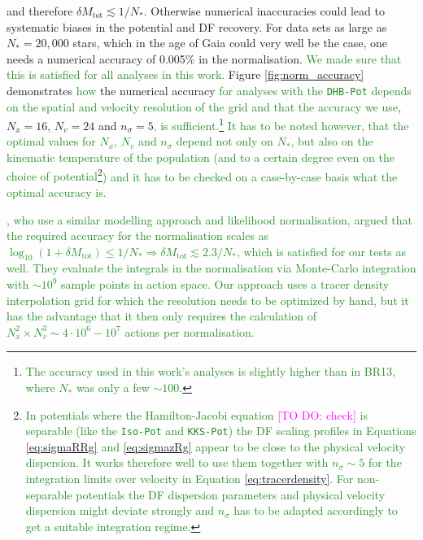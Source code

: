 \documentclass[iop,revtex4]{emulateapj}
\newcommand{\NEW}[1]{\textcolor{ForestGreen}{#1}}
\newcommand{\Wilma}[1]{\textcolor{Magenta}{#1}}
\newcommand{\OLD}[1]{}
\begin{document}
and therefore $\delta M_\text{tot} \lesssim 1/N_*$. Otherwise numerical inaccuracies could lead to systematic biases in the potential and DF recovery. For data sets as large as $N_* = 20,000$ stars, which in the age of Gaia could very well be the case, one needs a numerical accuracy of 0.005\% in the normalisation. \NEW{We made sure that this is satisfied for all analyses in this work.} Figure \ref{fig:norm_accuracy} demonstrates \NEW{how}\OLD{that} the numerical accuracy \OLD{we use in the analysis}\NEW{for analyses with the \texttt{DHB-Pot} depends on the spatial and velocity resolution of the grid and that the accuracy we use}, $N_x=16$, $N_v=24$ and $n_\sigma=5$\OLD{, does satisfy this requirement.}\NEW{, is sufficient.}\footnote{\NEW{The accuracy used in this work's analyses is slightly higher than in BR13, where $N_*$ was only a few $\sim 100$.}} \NEW{It has to be noted however, that the optimal values for $N_x$, $N_v$ and $n_\sigma$ depend not only on $N_*$, but also on the kinematic temperature of the population (and to a certain degree even on the choice of potential}\footnote{\NEW{In potentials where the Hamilton-Jacobi equation \Wilma{[TO DO: check]} is separable (like the \texttt{Iso-Pot} and \texttt{KKS-Pot}) the DF scaling profiles in Equations \eqref{eq:sigmaRRg} and \eqref{eq:sigmazRg} appear to be close to the physical velocity dispersion. It works therefore well to use them together with $n_\sigma \sim 5$ for the integration limits over velocity in Equation \eqref{eq:tracerdensity}. For non-separable potentials the DF dispersion parameters and physical velocity dispersion might deviate strongly and $n_\sigma$ has to be adapted accordingly to get a suitable integration regime.}}\NEW{) and it has to be checked on a case-by-case basis what the optimal accuracy is.} \OLD{This is slightly higher than in BR13, where $N_*$ was only a few $\sim 100$.}

\NEW{\citet{2013MNRAS.433.1411M}, who use a similar modelling approach and likelihood normalisation, argued that the required accuracy for the normalisation scales as $\log_{10} \left(1+\delta M_\text{tot} \right) \leq 1 / N_* \Rightarrow \delta M_\text{tot} \lesssim 2.3/N_*$, which is satisfied for our tests as well.  They evaluate the integrals in the normalisation via Monte-Carlo integration with $\sim 10^9$ sample points in action space. Our approach uses a tracer density interpolation grid for which the resolution needs to be optimized by hand, but it has the advantage that it then only requires the calculation of $N_x^2 \times N_v^3 \sim 4\cdot 10^{6} - 10^7$ actions per normalisation.}
\end{document}
